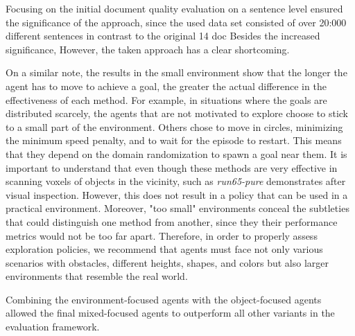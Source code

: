     
    
    Focusing on the initial document quality evaluation on a sentence level ensured the significance
    of the approach, since the used data set consisted of over 20:000 different sentences
    in contrast to the original 14 doc
    Besides the increased signiﬁcance, 
    However, the taken approach has a clear shortcoming. 
    
    
    
    
    On a similar note, the results in the small environment show that the longer the agent has to move to achieve a goal, the greater the actual difference in the effectiveness of each method.
    For example, in situations where the goals are distributed scarcely, the agents that are not motivated to explore choose to stick to a small part of the environment. 
    Others chose to move in circles, minimizing the minimum speed penalty, and to wait for the episode to restart. This means that they depend on the domain randomization to spawn a goal near them. It is important to understand that even though these methods are very effective in scanning voxels of objects in the vicinity, such as \textit{run65-pure} demonstrates after visual inspection. However, this does not result in a policy that can be used in a practical environment.
    Moreover, "too small" environments conceal the subtleties that could distinguish one method from another, since they their performance metrics would not be too far apart. 
    Therefore, in order to properly assess exploration policies, we recommend that agents must face not only various scenarios with obstacles, different heights, shapes, and colors but also larger environments that resemble the real world.
    
    
    
    Combining the environment-focused agents with the object-focused agents allowed the final mixed-focused agents to outperform all other variants in the evaluation framework.
    

